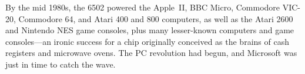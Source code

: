 By the mid 1980s, the 6502 powered the
Apple~II, BBC Micro, Commodore VIC-20, Commodore 64, and Atari 400 and
800 computers, as well as the Atari 2600 and Nintendo NES game
consoles, plus many lesser-known computers and game consoles---an
ironic success for a chip originally 
conceived as the brains of cash registers
and microwave ovens.
The PC revolution had begun, and Microsoft was just in
time to catch the wave.


